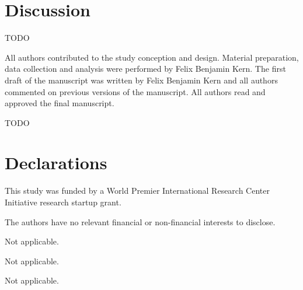 \documentclass[pdflatex,referee,iicol,sn-basic]{sn-jnl}
\theoremstyle{thmstyleone}%
\theoremstyle{thmstyletwo}%
\theoremstyle{thmstylethree}%
\begin{document}
\section{Discussion}\label{sec-discussion}






\backmatter

TODO

All authors contributed to the study conception and design. Material preparation, data collection and analysis were performed by Felix Benjamin Kern. The first draft of the manuscript was written by Felix Benjamin Kern and all authors commented on previous versions of the manuscript. All authors read and approved the final manuscript.

TODO

\section*{Declarations}

This study was funded by a World Premier International Research Center Initiative research startup grant.

The authors have no relevant financial or non-financial interests to disclose.

Not applicable.

Not applicable.

Not applicable.






\end{document}
